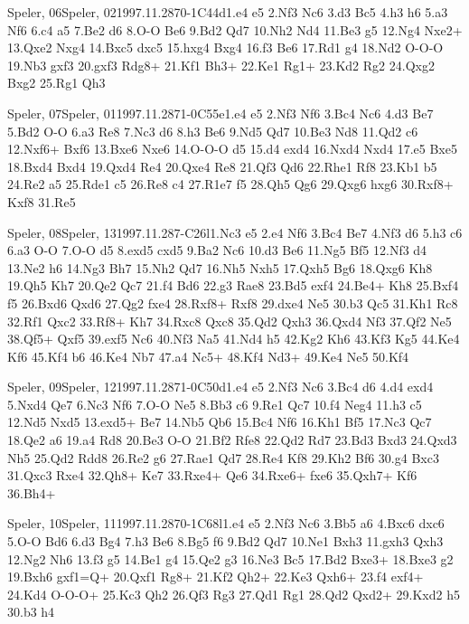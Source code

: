 \documentclass[twocolumn,a4paper,10pt]{report}
\begin{document}
\begin{chessgame}{Speler, 06}{Speler, 02}{1997.11.28}{7}{0-1}{C44d}{1.e4 e5 2.Nf3 Nc6 3.d3 Bc5 4.h3 h6 5.a3 Nf6 6.c4 a5 7.Be2 d6 8.O-O Be6 9.Bd2 Qd7 10.Nh2 Nd4 11.Be3 g5 12.Ng4 Nxe2+ 13.Qxe2 Nxg4 14.Bxc5 dxc5 15.hxg4 Bxg4 16.f3 Be6 17.Rd1 g4 18.Nd2 O-O-O 19.Nb3 gxf3 20.gxf3 Rdg8+ 21.Kf1 Bh3+ 22.Ke1 Rg1+ 23.Kd2 Rg2 24.Qxg2 Bxg2 25.Rg1 Qh3}\end{chessgame}
\begin{chessgame}{Speler, 07}{Speler, 01}{1997.11.28}{7}{1-0}{C55e}{1.e4 e5 2.Nf3 Nf6 3.Bc4 Nc6 4.d3 Be7 5.Bd2 O-O 6.a3 Re8 7.Nc3 d6 8.h3 Be6 9.Nd5 Qd7 10.Be3 Nd8 11.Qd2 c6 12.Nxf6+ Bxf6 13.Bxe6 Nxe6 14.O-O-O d5 15.d4 exd4 16.Nxd4 Nxd4 17.e5 Bxe5 18.Bxd4 Bxd4 19.Qxd4 Re4 20.Qxe4 Re8 21.Qf3 Qd6 22.Rhe1 Rf8 23.Kb1 b5 24.Re2 a5 25.Rde1 c5 26.Re8 c4 27.R1e7 f5 28.Qh5 Qg6 29.Qxg6 hxg6 30.Rxf8+ Kxf8 31.Re5}\end{chessgame}
\begin{chessgame}{Speler, 08}{Speler, 13}{1997.11.28}{7}{\textonehalf-\textonehalf}{C26l}{1.Nc3 e5 2.e4 Nf6 3.Bc4 Be7 4.Nf3 d6 5.h3 c6 6.a3 O-O 7.O-O d5 8.exd5 cxd5 9.Ba2 Nc6 10.d3 Be6 11.Ng5 Bf5 12.Nf3 d4 13.Ne2 h6 14.Ng3 Bh7 15.Nh2 Qd7 16.Nh5 Nxh5 17.Qxh5 Bg6 18.Qxg6 Kh8 19.Qh5 Kh7 20.Qe2 Qc7 21.f4 Bd6 22.g3 Rae8 23.Bd5 exf4 24.Be4+ Kh8 25.Bxf4 f5 26.Bxd6 Qxd6 27.Qg2 fxe4 28.Rxf8+ Rxf8 29.dxe4 Ne5 30.b3 Qc5 31.Kh1 Rc8 32.Rf1 Qxc2 33.Rf8+ Kh7 34.Rxc8 Qxc8 35.Qd2 Qxh3 36.Qxd4 Nf3 37.Qf2 Ne5 38.Qf5+ Qxf5 39.exf5 Nc6 40.Nf3 Na5 41.Nd4 h5 42.Kg2 Kh6 43.Kf3 Kg5 44.Ke4 Kf6 45.Kf4 b6 46.Ke4 Nb7 47.a4 Nc5+ 48.Kf4 Nd3+ 49.Ke4 Ne5 50.Kf4}\end{chessgame}
\begin{chessgame}{Speler, 09}{Speler, 12}{1997.11.28}{7}{1-0}{C50d}{1.e4 e5 2.Nf3 Nc6 3.Bc4 d6 4.d4 exd4 5.Nxd4 Qe7 6.Nc3 Nf6 7.O-O Ne5 8.Bb3 c6 9.Re1 Qc7 10.f4 Neg4 11.h3 c5 12.Nd5 Nxd5 13.exd5+ Be7 14.Nb5 Qb6 15.Bc4 Nf6 16.Kh1 Bf5 17.Nc3 Qc7 18.Qe2 a6 19.a4 Rd8 20.Be3 O-O 21.Bf2 Rfe8 22.Qd2 Rd7 23.Bd3 Bxd3 24.Qxd3 Nh5 25.Qd2 Rdd8 26.Re2 g6 27.Rae1 Qd7 28.Re4 Kf8 29.Kh2 Bf6 30.g4 Bxc3 31.Qxc3 Rxe4 32.Qh8+ Ke7 33.Rxe4+ Qe6 34.Rxe6+ fxe6 35.Qxh7+ Kf6 36.Bh4+}\end{chessgame}
\begin{chessgame}{Speler, 10}{Speler, 11}{1997.11.28}{7}{0-1}{C68l}{1.e4 e5 2.Nf3 Nc6 3.Bb5 a6 4.Bxc6 dxc6 5.O-O Bd6 6.d3 Bg4 7.h3 Be6 8.Bg5 f6 9.Bd2 Qd7 10.Ne1 Bxh3 11.gxh3 Qxh3 12.Ng2 Nh6 13.f3 g5 14.Be1 g4 15.Qe2 g3 16.Ne3 Bc5 17.Bd2 Bxe3+ 18.Bxe3 g2 19.Bxh6 gxf1=Q+ 20.Qxf1 Rg8+ 21.Kf2 Qh2+ 22.Ke3 Qxh6+ 23.f4 exf4+ 24.Kd4 O-O-O+ 25.Kc3 Qh2 26.Qf3 Rg3 27.Qd1 Rg1 28.Qd2 Qxd2+ 29.Kxd2 h5 30.b3 h4}\end{chessgame}
\end{document}
